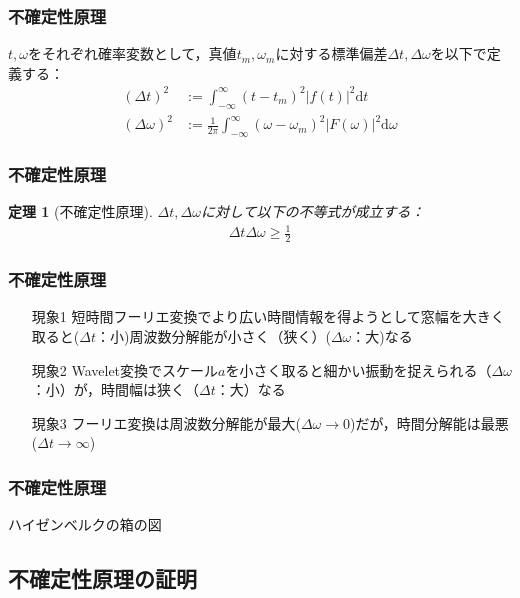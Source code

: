 \documentclass[dvipdfmx,graphicx,14pt]{beamer}
\newtheorem{mytheorem}{定理}
\begin{document}
\begin{frame}[c]
    \frametitle{不確定性原理}
    $t, \omega$をそれぞれ確率変数として，真値$t_{m}, \omega_{m}$に対する標準偏差$\Delta t, \Delta \omega$を以下で定義する：
    \begin{align}
        (\Delta t)^{2} &:= \int_{-\infty}^{\infty} (t - t_{m})^{2} |f(t)|^{2} \mathrm{d}t \\
        (\Delta \omega)^{2} &:= \frac{1}{2\pi} \int_{-\infty}^{\infty} (\omega - \omega_{m})^{2} |F(\omega)|^{2} \mathrm{d}\omega 
    \end{align}
\end{frame}

\begin{frame}[c]
    \frametitle{不確定性原理}
    \begin{mytheorem}[不確定性原理]
        $\Delta t, \Delta \omega$に対して以下の不等式が成立する：
        \begin{align}
            \Delta t \Delta \omega \geq \frac{1}{2}
        \end{align}
    \end{mytheorem}
\end{frame}

\begin{frame}[c]
    \frametitle{不確定性原理}
    \begin{itemize}
        \item[現象1] 短時間フーリエ変換でより広い時間情報を得ようとして窓幅を大きく取ると($\Delta t$：小)周波数分解能が小さく（狭く）($\Delta \omega$：大)なる
        \item[現象2] Wavelet変換でスケール$a$を小さく取ると細かい振動を捉えられる（$\Delta \omega$：小）が，時間幅は狭く（$\Delta t$：大）なる
        \item[現象3] フーリエ変換は周波数分解能が最大($\Delta \omega \to 0$)だが，時間分解能は最悪($\Delta t \to \infty$)
    \end{itemize}
\end{frame}

\begin{frame}[c]
    \frametitle{不確定性原理}
    ハイゼンベルクの箱の図
\end{frame}

\subsection{不確定性原理の証明} 
\end{document}
